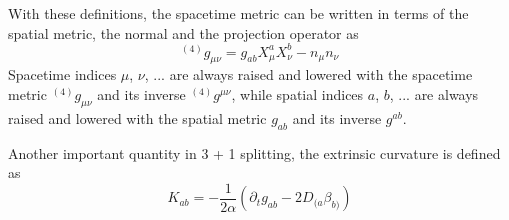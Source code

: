 \documentclass[letterpaper,nofootinbib,prd,amsmath,onecolumn]{revtex4-1}
\begin{document}
With these definitions, the spacetime metric can be written in terms of the spatial metric, the normal and the projection operator as
\begin{equation}
^{(4)}g_{\mu\nu} = g_{ab}X^{a}_{\mu}X^{b}_{\nu} - n_{\mu}n_{\nu}
\end{equation}
Spacetime indices $\mu$, $\nu$, ... are always raised and lowered with the spacetime metric $^{(4)}g_{\mu\nu}$ and its inverse $^{(4)}g^{\mu\nu}$, while spatial indices $a$, $b$, ... are always raised and lowered with the spatial metric $g_{ab}$ and its inverse $g^{ab}$. 

Another important quantity in 3 + 1 splitting, the extrinsic curvature is defined as
\begin{equation}
K_{ab} = - \frac{1}{2\alpha}(\partial_{t}g_{ab} - 2D_{(a}\beta_{b)})
\end{equation}
\section{}\label{transform}
\section{}\label{gauge}
\section{}\label{example}
\end{document}
